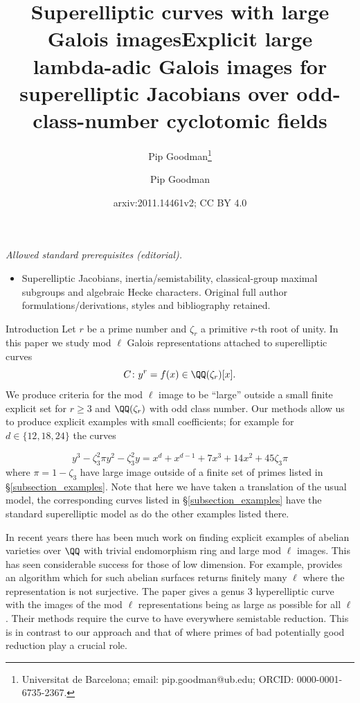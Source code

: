 \documentclass[11pt,a4paper]{article}
\title{Superelliptic curves with large Galois images}
\author{Pip Goodman\footnote{Universitat de Barcelona; email: pip.goodman@ub.edu; ORCID: 0000-0001-6735-2367.} }
\date{}
\title{Explicit large lambda-adic Galois images for superelliptic Jacobians over odd-class-number cyclotomic fields}
\author{Pip Goodman}
\date{arxiv:2011.14461v2; CC BY 4.0}
\newcommand{\Qr}{{\QQ(\zeta_r)}}
\newcommand{\zr}{\zeta_r}
\begin{document}
\maketitle
\noindent\textit{Allowed standard prerequisites (editorial).}\begin{itemize}
\item Superelliptic Jacobians, inertia/semistability, classical-group maximal subgroups and algebraic Hecke characters. Original full author formulations/derivations, styles and bibliography retained.
\end{itemize}\medskip
{}
\tableofcontents
\newpage

\begin{section}{Introduction}
\label{section_introduction}
Let $r$ be a prime number and $\zr$ a primitive $r$-th root of unity. In this paper we study  mod $\ell$ Galois representations attached to superelliptic curves 
\[C\colon y^r = f(x) \in \Qr[x].\]
We produce criteria for the mod $\ell$ image to be ``large'' outside a small finite explicit set for $r\geq 3$ and $\Qr$ with odd class number.
Our methods allow us to produce explicit examples with small coefficients; for example for $d \in \{12,18,24\}$ the curves

\begin{equation} \label{eq:introduction_examples}
y^3 - \zeta_3^2 \pi y^2 - \zeta_3^2 y= x^{d} + x^{d-1} + 7x^3 + 14 x^2 + 45\zeta_3\pi
\end{equation}
where $\pi = 1- \zeta_3$ have large image outside of a finite set of primes listed in  \S \ref{subsection_examples}. Note that here we have taken a translation of the usual model, the corresponding curves listed in \S \ref{subsection_examples} have the standard superelliptic model as do the other examples listed there.

In recent years there has been much work on finding explicit examples of abelian varieties over $\QQ$ with trivial endomorphism ring and large mod $\ell$ images.
This has seen considerable success for those of low dimension.
For example, \cite{Dieulefait_genus2} provides an algorithm which for such abelian surfaces returns finitely many $\ell$ where the representation is not surjective.
The paper \cite{Anni_Lemos_Siksek} gives a genus 3 hyperelliptic curve with the images of the mod $\ell$ representations being as large as possible for all $\ell$.
Their methods require the curve to have everywhere semistable reduction.
This is in contrast to our approach and that of \cite{Anni_VDok} where primes of bad potentially good reduction play a crucial role.


\end{section}
\end{document}
